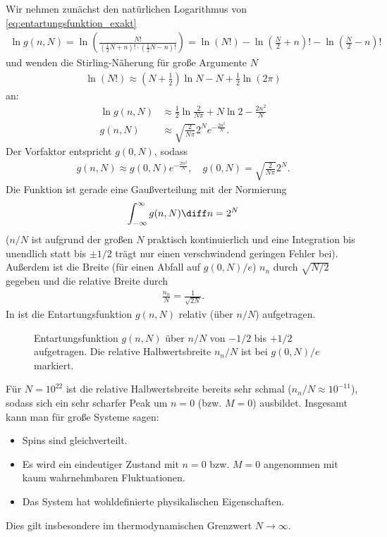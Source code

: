 Wir nehmen zunächst den natürlichen Logarithmus von \eqref{eq:entartungsfunktion_exakt}
\begin{align*}
    \ln g(n,N) = \ln \left( \frac{N!}{\left(\frac{1}{2}N+n\right)!\cdot \left( \frac{1}{2}N-n \right)!} \right) = \ln (N!) - \ln\left( \frac{N}{2}+n \right)!- \ln\left( \frac{N}{2}-n \right)!
\end{align*}
und wenden die Stirling-Näherung für große Argumente $N$
\begin{align*}
    \ln (N!) \approx \left( N+\frac{1}{2} \right)\ln N-N+\frac{1}{2}\ln(2\pi )
\end{align*}
an:
\begin{align*}
    \ln g(n,N) & \approx \frac{1}{2}\ln\frac{2}{N\pi}+N\ln 2-\frac{2n^2}{N} \\
    g(n,N)     & \approx \sqrt{\frac{2}{N\pi }}2^N e^{-\frac{2n^2}{N}}.
\end{align*}
Der Vorfaktor entspricht $g(0,N)$, sodass
\begin{align}
    \label{eq:entartungsfunktion_naeherung}
    g(n,N) \approx g(0,N) e^{-\frac{2n^2}{N}}, \quad g(0,N) =  \sqrt{\frac{2}{N\pi }}2^N.
\end{align}
Die Funktion ist gerade eine Gaußverteilung mit der Normierung
\begin{align*}
    \int_{-\infty}^{\infty} g(n,N)\diff n=2^N
\end{align*}
($n/N$ ist aufgrund der großen $N$ praktisch kontinuierlich und eine Integration bis unendlich statt bis $\pm 1/2$ trägt nur einen verschwindend geringen Fehler bei). Außerdem ist die Breite (für einen Abfall auf $g(0,N)/e$) $n_n$ durch $\sqrt{N/2}$ gegeben und die relative Breite durch
\begin{align}
    \label{eq:relative_breite}
    \frac{n_n}{N} = \frac{1}{\sqrt{2N}}.
\end{align}
In  ist die Entartungsfunktion $g(n,N)$ relativ (über $n/N$) aufgetragen.

\begin{figure}[htbp]
    \centering
    \tfigDegeneracyFunctionGauss
    \caption{Entartungsfunktion $g(n,N)$ über $n/N$ von $-1/2$ bis $+1/2$ aufgetragen. Die relative Halbwertsbreite $n_n/N$ ist bei $g(0,N)/e$ markiert. }
    \label{fig:DegeneracyFunctionGauss}
\end{figure}

Für $N=10^{22}$ ist die relative Halbwertsbreite bereits sehr schmal ($n_n/N\approx 10^{-11}$), sodass sich ein sehr scharfer Peak um $n=0$ (bzw. $M=0$) ausbildet. Insgesamt kann man für große Systeme sagen:
\begin{itemize}
    \item Spins sind gleichverteilt.
    \item Es wird ein eindeutiger Zustand mit $n=0$ bzw. $M=0$ angenommen mit kaum wahrnehmbaren Fluktuationen.
    \item Das System hat wohldefinierte physikalischen Eigenschaften.
\end{itemize}
Dies gilt insbesondere im thermodynamischen Grenzwert $N\rightarrow\infty$.


